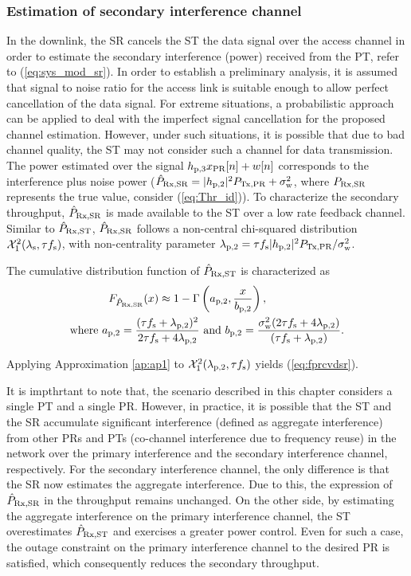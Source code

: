 \subsubsection{Estimation of secondary interference channel}
In the downlink, the SR cancels the ST the data signal over the access channel in order to estimate the secondary interference (power) received from the PT, refer to (\ref{eq:sys_mod_sr}). In order to establish a preliminary analysis, it is assumed that signal to noise ratio for the access link is suitable enough to allow perfect cancellation of the data signal. For extreme situations, a probabilistic approach can be applied to deal with the imperfect signal cancellation for the proposed channel estimation. However, under such situations, it is possible that due to bad channel quality, the ST may not consider such a channel for data transmission. The power estimated over the signal $h_{\text{p,3}} x_{\text{PR}}[n] + w[n]$ corresponds to the interference plus noise power ($\hat{P}_{\text{Rx,SR}} = |h_{\text{p,2}}|^2 P_{\text{Tx,PR}} + \sigma^2_{\text{w}}$, where $P_{\text{Rx,SR}}$ represents the true value, consider (\ref{eq:Thr_id})). To characterize the secondary throughput, $\hat{P}_{\text{Rx,SR}}$ is made available to the ST over a low rate feedback channel. Similar to $\hat{P}_{\text{Rx,ST}}$, $\hat{P}_{\text{Rx,SR}}$ follows a non-central chi-squared distribution $\ncchi2(\ls, \tau \fsam)$, with non-centrality parameter $\lambda_{\text{p,2}} = \tau f_{\text{s}} |h_{\text{p,2}}|^2 P_{\text{Tx,PR}} / \sigma^2_{\text{w}}$.
\begin{lemma} \label{lm:lm3}
\normalfont
The cumulative distribution function of $\hat{P}_{\text{Rx,ST}}$ is characterized as 
\begin{align}
F_{\hat{P}_{\text{Rx,SR}}}(x) \approx 1 - \Gamma&\left(a_{\text{p,2}}, \frac{x}{b_{\text{p,2}}}\right) \label{eq:fprcvdsr}, \\ 
\text{where  } a_{\text{p,2}} = \frac{(\tau f_{\text{s}} + \lambda_{\text{p,2}})^2}{2 \tau f_{\text{s}} + 4 \lambda_{\text{p,2}}} &\text{ and } b_{\text{p,2}} = \frac{\sigma^2_{\text{w}} (2 \tau f_{\text{s}} + 4 \lambda_{\text{p,2}})}{(\tau f_{\text{s}} + \lambda_{\text{p,2}})}.  \label{eq:para_pt} 
\end{align} 
\end{lemma}
\begin{IEEEproof}
Applying Approximation \ref{ap:ap1} to $\ncchi2(\lpt, \tau \fsam)$ yields (\ref{eq:fprcvdsr}). 
\end{IEEEproof}
\begin{remark}
\normalfont
It is impthrtant to note that, the scenario described in this chapter considers a single PT and a single PR. However, in practice, it is possible that the ST and the SR accumulate significant interference (defined as aggregate interference) from other PRs and PTs (co-channel interference due to frequency reuse) in the network\cite{Elsawy13_cmag,Kaushik14_P} over the primary interference and the secondary interference channel, respectively. For the secondary interference channel, the only difference is that the SR now estimates the aggregate interference. Due to this, the expression of $\hat{P}_{\text{Rx,SR}}$ in the throughput remains unchanged. On the other side, by estimating the aggregate interference on the primary interference channel, the ST overestimates $\hat{P}_{\text{Rx,ST}}$ and exercises a greater power control. Even for such a case, the outage constraint on the primary interference channel to the desired PR is satisfied, which consequently reduces the secondary throughput.  
\end{remark}
